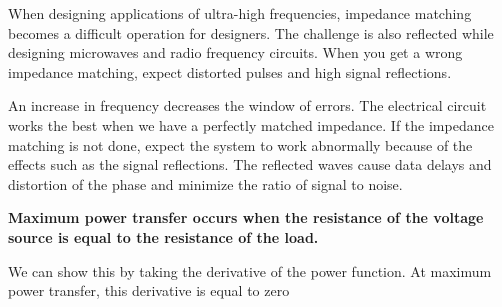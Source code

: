 When designing applications of ultra-high frequencies, impedance matching becomes a difficult operation for designers. 
The challenge is also reflected while designing microwaves and radio frequency circuits. When you get a wrong impedance matching, expect distorted pulses and high signal reflections.

An increase in frequency decreases the window of errors. 
The electrical circuit works the best when we have a perfectly matched impedance. 
If the impedance matching is not done, expect the system to work abnormally because of the effects such as the signal reflections. 
The reflected waves cause data delays and distortion of the phase and minimize the ratio of signal to noise.


\textbf{Maximum power transfer occurs when the resistance of the voltage source is equal to the resistance of the load.}

We can show this by taking the derivative of the power function. 
At maximum power transfer, this derivative is equal to zero

